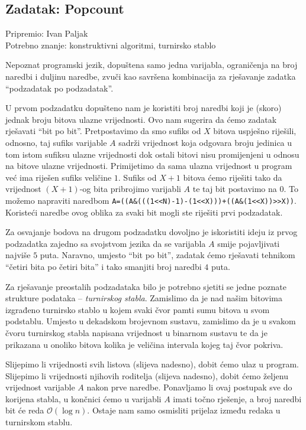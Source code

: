 \documentclass[a4paper]{article}
\begin{document}
\subsection*{Zadatak: Popcount}
\textsf{Pripremio: Ivan Paljak}\\
\textsf{Potrebno znanje: konstruktivni algoritmi, turnirsko stablo}

Nepoznat programski jezik, dopuštena samo jedna varijabla, ograničenja na broj
naredbi i duljinu naredbe, zvuči kao savršena kombinacija za rješavanje zadatka
``podzadatak po podzadatak''.

U prvom podzadatku dopušteno nam je koristiti broj naredbi koji je (skoro)
jednak broju bitova ulazne vrijednosti. Ovo nam sugerira da ćemo zadatak
rješavati ``bit po bit''. Pretpostavimo da smo sufiks od $X$ bitova uspješno
riješili, odnosno, taj sufiks varijable $A$ sadrži vrijednost koja odgovara
broju jedinica u tom istom sufiksu ulazne vrijednosti dok ostali
bitovi nisu promijenjeni u odnosu na bitove ulazne vrijednosti. Primijetimo da
sama ulazna vrijednost u program već ima riješen sufiks veličine $1$. Sufiks od
$X+1$ bitova ćemo riješiti tako da vrijednost $(X+1)$-og bita pribrojimo
varijabli $A$ te taj bit postavimo na $0$. To možemo napraviti naredbom
\verb|A=((A&(((1<<N)-1)-(1<<X)))+((A&(1<<X))>>X))|. Koristeći naredbe ovog
oblika za svaki bit mogli ste riješiti prvi podzadatak.

Za osvajanje bodova na drugom podzadatku dovoljno je iskoristiti ideju iz prvog
podzadatka zajedno sa svojstvom jezika da se varijabla $A$ smije pojavljivati
najviše $5$ puta. Naravno, umjesto ``bit po bit'', zadatak ćemo rješavati
tehnikom ``četiri bita po četiri bita'' i tako smanjiti broj naredbi $4$ puta.

Za rješavanje preostalih podzadataka bilo je potrebno sjetiti se jedne poznate
strukture podataka -- \textit{turnirskog stabla}. Zamislimo da je nad našim
bitovima izgrađeno turnirsko stablo u kojem svaki čvor pamti sumu bitova u svom
podstablu. Umjesto u dekadskom brojevnom sustavu, zamislimo da je u svakom čvoru
turnirskog stabla napisana vrijednost u binarnom sustavu te da je prikazana u
onoliko bitova kolika je veličina intervala kojeg taj čvor pokriva.

Slijepimo li vrijednosti svih listova (slijeva nadesno), dobit ćemo ulaz u
program.  Slijepimo li vrijednosti njihovih roditelja (slijeva nadesno), dobit
ćemo željenu vrijednost varijable $A$ nakon prve naredbe. Ponavljamo li ovaj
postupak sve do korijena stabla, u končnici ćemo u varijabli $A$ imati
točno rješenje, a broj naredbi bit će reda $\mathcal{O}(\log n)$. Ostaje nam
samo osmisliti prijelaz između redaka u turnirskom stablu.
\end{document}
